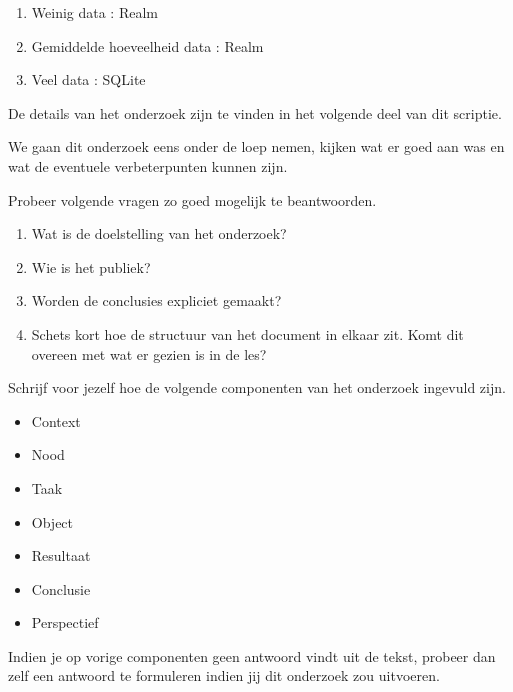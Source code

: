 \begin{displayquote}
  \begin{enumerate}
    \item Weinig data : Realm
    \item Gemiddelde hoeveelheid data : Realm
    \item Veel data : SQLite
  \end{enumerate}
  De details van het onderzoek zijn te vinden in het volgende deel van dit scriptie.
\end{displayquote}

We gaan dit onderzoek eens onder de loep nemen, kijken wat er goed aan was en wat de eventuele verbeterpunten kunnen zijn. 

\begin{exercise}
  Probeer volgende vragen zo goed mogelijk te beantwoorden.
  \begin{enumerate}
    \item Wat is de doelstelling van het onderzoek?
    \item Wie is het publiek?
    \item Worden de conclusies expliciet gemaakt? 
    \item Schets kort hoe de structuur van het document in elkaar zit. Komt dit overeen met wat er gezien is in de les?
  \end{enumerate}
\end{exercise}

\begin{exercise}
  Schrijf voor jezelf hoe de volgende componenten van het onderzoek ingevuld zijn.
  \begin{itemize}
    \item Context
    \item Nood
    \item Taak
    \item Object
    \item Resultaat
    \item Conclusie
    \item Perspectief
  \end{itemize}
  
  Indien je op vorige componenten geen antwoord vindt uit de tekst, probeer dan zelf een antwoord te formuleren indien jij dit onderzoek zou uitvoeren. 
\end{exercise}

